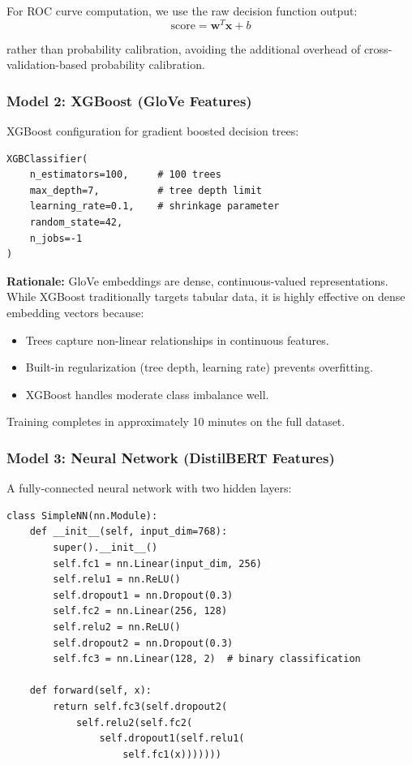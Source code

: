 \documentclass[12pt, a4paper]{article}
\begin{document}
For ROC curve computation, we use the raw decision function output:
\begin{equation}
\text{score} = \mathbf{w}^T \mathbf{x} + b
\end{equation}

rather than probability calibration, avoiding the additional overhead of cross-validation-based probability calibration.

\subsubsection{Model 2: XGBoost (GloVe Features)}

XGBoost configuration for gradient boosted decision trees:

\begin{lstlisting}
XGBClassifier(
    n_estimators=100,     # 100 trees
    max_depth=7,          # tree depth limit
    learning_rate=0.1,    # shrinkage parameter
    random_state=42,
    n_jobs=-1
)
\end{lstlisting}

\textbf{Rationale:} GloVe embeddings are dense, continuous-valued representations. While XGBoost traditionally targets tabular data, it is highly effective on dense embedding vectors because:
\begin{itemize}
    \item Trees capture non-linear relationships in continuous features.
    \item Built-in regularization (tree depth, learning rate) prevents overfitting.
    \item XGBoost handles moderate class imbalance well.
\end{itemize}

Training completes in approximately 10 minutes on the full dataset.

\subsubsection{Model 3: Neural Network (DistilBERT Features)}

A fully-connected neural network with two hidden layers:

\begin{lstlisting}
class SimpleNN(nn.Module):
    def __init__(self, input_dim=768):
        super().__init__()
        self.fc1 = nn.Linear(input_dim, 256)
        self.relu1 = nn.ReLU()
        self.dropout1 = nn.Dropout(0.3)
        self.fc2 = nn.Linear(256, 128)
        self.relu2 = nn.ReLU()
        self.dropout2 = nn.Dropout(0.3)
        self.fc3 = nn.Linear(128, 2)  # binary classification
    
    def forward(self, x):
        return self.fc3(self.dropout2(
            self.relu2(self.fc2(
                self.dropout1(self.relu1(
                    self.fc1(x)))))))
\end{lstlisting}
\end{document}
